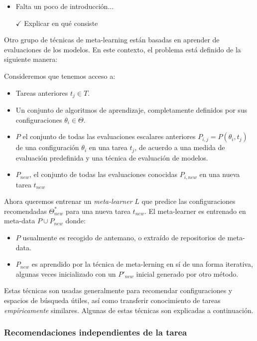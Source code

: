 \begin{itemize}
	\item Falta un poco de introducción...
	\item[$\checkmark$] Explicar en qué consiste
\end{itemize}

Otro grupo de técnicas de meta-learning están basadas 	en aprender de evaluaciones de los modelos. En este contexto, el problema está definido de la siguiente manera:

\begin{definition}
Consideremos que tenemos acceso a:

\begin{itemize}
	\item Tareas anteriores $t_j \in T$.
	\item Un conjunto de algoritmos de aprendizaje, completamente definidos por sus configuraciones $\theta_i \in \Theta$.
	\item $P$ el conjunto de todas las evaluaciones escalares anteriores $P_{i,j} = P(\theta_i, t_j)$ de una configuración $\theta_i$ en una tarea $t_j$, de acuerdo a una medida de evaluación predefinida y una técnica de evaluación de modelos. 
	\item $P_{new}$, el conjunto de todas las evaluaciones conocidas $P_{i, new}$ en una nueva tarea $t_{new}$ 
\end{itemize}

Ahora queremos entrenar un \emph{meta-learner} $L$ que predice las configuraciones recomendadas $\Theta^*_{new}$ para una nueva tarea $t_{new}$. El meta-learner es entrenado en meta-data $P\cup P_{new}$ donde:

\begin{itemize}
	\item $P$ usualmente es recogido de antemano, o extraído de repositorios de meta-data.
	\item $P_{new}$ es aprendido por la técnica de meta-lerning en sí de una forma iterativa, algunas veces inicializado con un $P'_{new}$ inicial generado por otro método.
\end{itemize}
\end{definition}

Estas técnicas son usadas generalmente para recomendar configuraciones y espacios de búsqueda útiles, así como transferir conocimiento de tareas \textit{empíricamente} similares. Algunas de estas técnicas son explicadas a continuación. 

\subsubsection{Recomendaciones independientes de la tarea}


